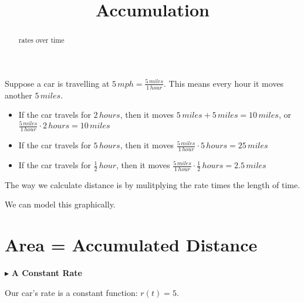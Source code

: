\documentclass{ximera}
\title{Accumulation}
\begin{document}
\begin{abstract}
rates over time
\end{abstract}
\maketitle



Suppose a car is travelling at $5 \, mph = \frac{5 \, miles}{1 \, hour}$. This means every hour it moves another $5 \, miles$.

\begin{itemize}
\item If the car travels for $2 \, hours$, then it moves $5 \, miles + 5 \, miles = 10 \, miles$, or $\frac{5 \, miles}{1 \, hour} \cdot 2 \, hours = 10 \, miles$

\item If the car travels for $5 \, hours$, then it moves $\frac{5 \, miles}{1 \, hour} \cdot 5 \, hours = 25 \, miles$

\item If the car travels for $\frac{1}{2} \, hour$, then it moves $\frac{5 \, miles}{1 \, hour} \cdot \frac{1}{2} \, hours = 2.5 \,miles$
\end{itemize}


The way we calculate distance is by mulitplying the rate times the length of time.

We can model this graphically.










\section{Area = Accumulated Distance}



$\blacktriangleright$ \textbf{A Constant Rate}



Our car's rate is a constant function: $r(t) = 5$. \\
\end{document}
